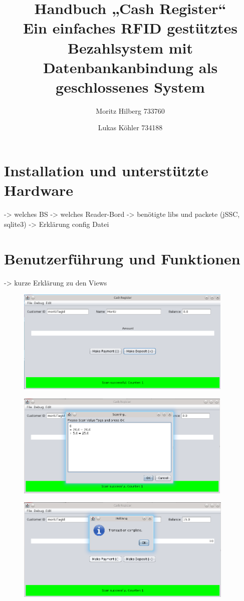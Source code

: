 \documentclass[11pt]{article} %
\title{Handbuch „Cash Register“ \\ \large Ein einfaches RFID gestütztes Bezahlsystem mit Datenbankanbindung als geschlossenes System}
\author{Moritz Hilberg 733760 \and Lukas Köhler 734188}
\begin{document}
\maketitle
\tableofcontents
\section{Installation und unterstützte Hardware}

-> welches BS
-> welches Reader-Bord
-> benötigte libs und packete (jSSC, sqlite3)
-> Erklärung config Datei

\section{Benutzerführung und Funktionen}
-> kurze Erklärung zu den Views

\begin{figure}[htb] \centering
\includegraphics[height=5cm,keepaspectratio]{snapshot1.png}
\caption{}
\end{figure}

\begin{figure}[htb] \centering
\includegraphics[height=5cm,keepaspectratio]{snapshot2.png}
\caption{}
\end{figure}

\begin{figure}[htb] \centering
\includegraphics[height=5cm,keepaspectratio]{snapshot3.png}
\caption{}
\end{figure}
\end{document}
